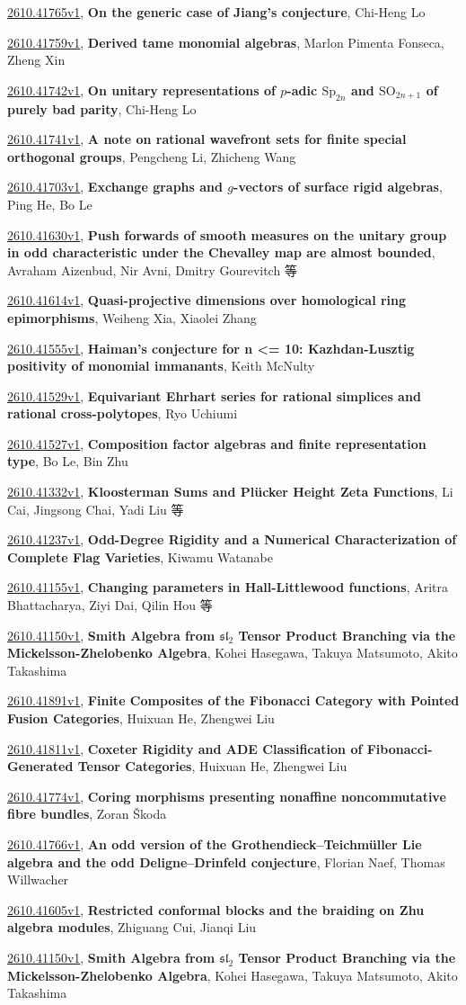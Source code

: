 \documentclass[9pt, a4paper]{article}
\theoremstyle{plain}
\theoremstyle{definition}
\theoremstyle{remark}
\newcommand{\arxiv}[3]{\href{https://arxiv.org/abs/#1}{#1}, \textbf{\textcolor{arxivblue}{#2}}, #3}
\begin{document}
\arxiv{2610.41765v1}{On the generic case of Jiang's conjecture}{Chi-Heng Lo}

\arxiv{2610.41759v1}{Derived tame monomial algebras}{Marlon Pimenta Fonseca, Zheng Xin}

\arxiv{2610.41742v1}{On unitary representations of $p$-adic $\textrm{Sp}_{2n}$ and $\textrm{SO}_{2n+1}$ of purely bad parity}{Chi-Heng Lo}

\arxiv{2610.41741v1}{A note on rational wavefront sets for finite special orthogonal groups}{Pengcheng Li, Zhicheng Wang}

\arxiv{2610.41703v1}{Exchange graphs and $g$-vectors of surface rigid algebras}{Ping He, Bo Le}

\arxiv{2610.41630v1}{Push forwards of smooth measures on the unitary group in odd characteristic under the Chevalley map are almost bounded}{Avraham Aizenbud, Nir Avni, Dmitry Gourevitch 等}

\arxiv{2610.41614v1}{Quasi-projective dimensions over homological ring epimorphisms}{Weiheng Xia, Xiaolei Zhang}

\arxiv{2610.41555v1}{Haiman's conjecture for n <= 10: Kazhdan-Lusztig positivity of monomial immanants}{Keith McNulty}

\arxiv{2610.41529v1}{Equivariant Ehrhart series for rational simplices and rational cross-polytopes}{Ryo Uchiumi}

\arxiv{2610.41527v1}{Composition factor algebras and finite representation type}{Bo Le, Bin Zhu}

\arxiv{2610.41332v1}{Kloosterman Sums and Plücker Height Zeta Functions}{Li Cai, Jingsong Chai, Yadi Liu 等}

\arxiv{2610.41237v1}{Odd-Degree Rigidity and a Numerical Characterization of Complete Flag Varieties}{Kiwamu Watanabe}

\arxiv{2610.41155v1}{Changing parameters in Hall-Littlewood functions}{Aritra Bhattacharya, Ziyi Dai, Qilin Hou 等}

\arxiv{2610.41150v1}{Smith Algebra from $\mathfrak{sl}_2$ Tensor Product Branching via the Mickelsson-Zhelobenko Algebra}{Kohei Hasegawa, Takuya Matsumoto, Akito Takashima}

\arxiv{2610.41891v1}{Finite Composites of the Fibonacci Category with Pointed Fusion Categories}{Huixuan He, Zhengwei Liu}

\arxiv{2610.41811v1}{Coxeter Rigidity and ADE Classification of Fibonacci-Generated Tensor Categories}{Huixuan He, Zhengwei Liu}

\arxiv{2610.41774v1}{Coring morphisms presenting nonaffine noncommutative fibre bundles}{Zoran Škoda}

\arxiv{2610.41766v1}{An odd version of the Grothendieck--Teichmüller Lie algebra and the odd Deligne--Drinfeld conjecture}{Florian Naef, Thomas Willwacher}

\arxiv{2610.41605v1}{Restricted conformal blocks and the braiding on Zhu algebra modules}{Zhiguang Cui, Jianqi Liu}

\arxiv{2610.41150v1}{Smith Algebra from $\mathfrak{sl}_2$ Tensor Product Branching via the Mickelsson-Zhelobenko Algebra}{Kohei Hasegawa, Takuya Matsumoto, Akito Takashima}

\end{document}
